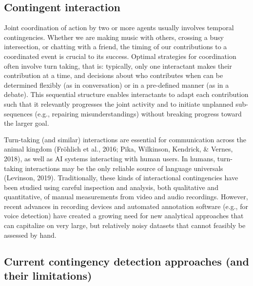 \documentclass[10pt, letterpaper]{article}
\begin{document}
\hypertarget{contingent-interaction}{%
\subsection{Contingent interaction}\label{contingent-interaction}}

Joint coordination of action by two or more agents usually involves
temporal contingencies. Whether we are making music with others,
crossing a busy intersection, or chatting with a friend, the timing of
our contributions to a coordinated event is crucial to its success.
Optimal strategies for coordination often involve turn taking, that is:
typically, only one interactant makes their contribution at a time, and
decisions about who contributes when can be determined flexibly (as in
conversation) or in a pre-defined manner (as in a debate). This
sequential structure enables interactants to adapt each contribution
such that it relevantly progresses the joint activity and to initiate
unplanned sub-sequences (e.g., repairing misunderstandings) without
breaking progress toward the larger goal.

Turn-taking (and similar) interactions are essential for communication
across the animal kingdom (Fröhlich et al., 2016; Pika, Wilkinson,
Kendrick, \& Vernes, 2018), as well as AI systems interacting with human
users. In humans, turn-taking interactions may be the only reliable
source of language universals (Levinson, 2019). Traditionally, these
kinds of interactional contingencies have been studied using careful
inspection and analysis, both qualitative and quantitative, of manual
measurements from video and audio recordings. However, recent advances
in recording devices and automated annotation software (e.g., for voice
detection) have created a growing need for new analytical approaches
that can capitalize on very large, but relatively noisy datasets that
cannot feasibly be assessed by hand.

\hypertarget{current-contingency-detection-approaches-and-their-limitations}{%
\subsection{Current contingency detection approaches (and their
limitations)}\label{current-contingency-detection-approaches-and-their-limitations}}
\end{document}
